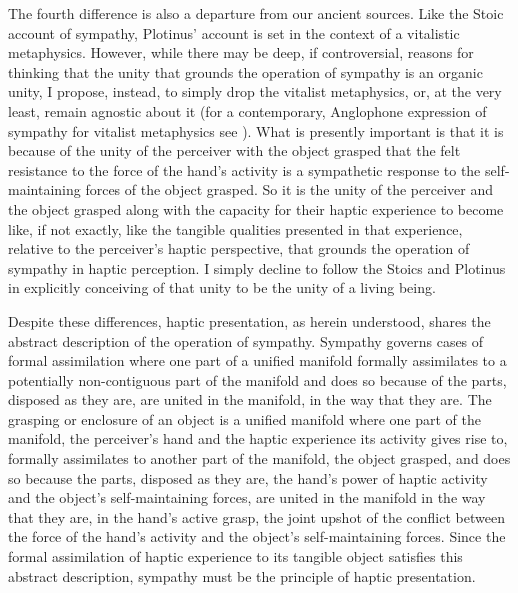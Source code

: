 The fourth difference is also a departure from our ancient sources. Like the Stoic account of sympathy, Plotinus' account is set in the context of a vitalistic metaphysics. However, while there may be deep, if controversial, reasons for thinking that the unity that grounds the operation of sympathy is an organic unity, I propose, instead, to simply drop the vitalist metaphysics, or, at the very least, remain agnostic about it (for a contemporary, Anglophone expression of sympathy for vitalist metaphysics see \citealt{Nagel:2012as}). What is presently important is that it is because of the unity of the perceiver with the object grasped that the felt resistance to the force of the hand's activity is a sympathetic response to the self-maintaining forces of the object grasped. So it is the unity of the perceiver and the object grasped along with the capacity for their haptic experience to become like, if not exactly, like the tangible qualities presented in that experience, relative to the perceiver's haptic perspective, that grounds the operation of sympathy in haptic perception. I simply decline to follow the Stoics and Plotinus in explicitly conceiving of that unity to be the unity of a living being.

Despite these differences, haptic presentation, as herein understood, shares the abstract description of the operation of sympathy. Sympathy governs cases of formal assimilation where one part of a unified manifold formally assimilates to a potentially non-contiguous part of the manifold and does so because of the parts, disposed as they are, are united in the manifold, in the way that they are. The grasping or enclosure of an object is a unified manifold where one part of the manifold, the perceiver's hand and the haptic experience its activity gives rise to, formally assimilates to another part of the manifold, the object grasped, and does so because the parts, disposed as they are, the hand’s power of haptic activity and the object's self-maintaining forces, are united in the manifold in the way that they are, in the hand's active grasp, the joint upshot of the conflict between the force of the hand’s activity and the object’s self-maintaining forces. Since the formal assimilation of haptic experience to its tangible object satisfies this abstract description, sympathy must be the principle of haptic presentation.

